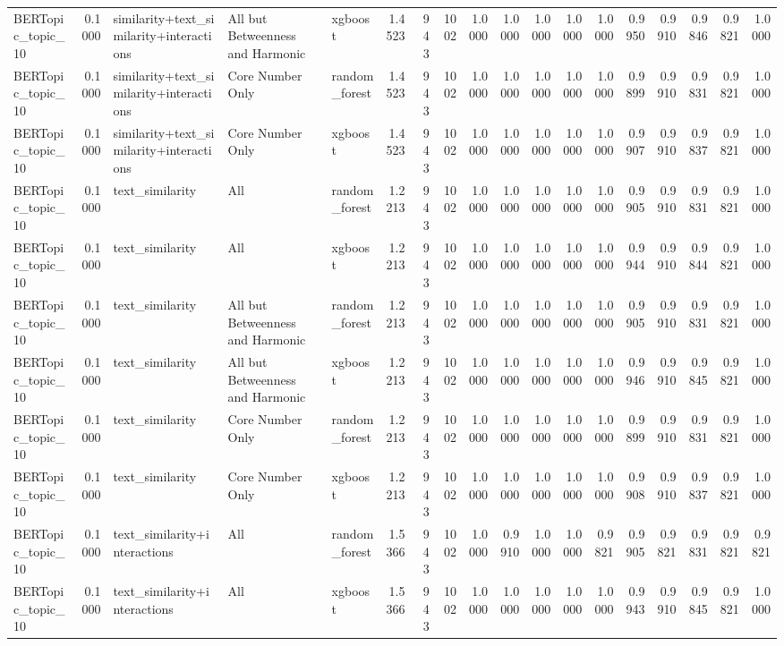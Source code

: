 \begin{tabular}{lrlllrrrrrrrrrrrrr}
BERTopic_topic_10 & 0.1000 & similarity+text_similarity+interactions & All but Betweenness and Harmonic & xgboost & 1.4523 & 943 & 1002 & 1.0000 & 1.0000 & 1.0000 & 1.0000 & 1.0000 & 0.9950 & 0.9910 & 0.9846 & 0.9821 & 1.0000 \\
BERTopic_topic_10 & 0.1000 & similarity+text_similarity+interactions & Core Number Only & random_forest & 1.4523 & 943 & 1002 & 1.0000 & 1.0000 & 1.0000 & 1.0000 & 1.0000 & 0.9899 & 0.9910 & 0.9831 & 0.9821 & 1.0000 \\
BERTopic_topic_10 & 0.1000 & similarity+text_similarity+interactions & Core Number Only & xgboost & 1.4523 & 943 & 1002 & 1.0000 & 1.0000 & 1.0000 & 1.0000 & 1.0000 & 0.9907 & 0.9910 & 0.9837 & 0.9821 & 1.0000 \\
BERTopic_topic_10 & 0.1000 & text_similarity & All & random_forest & 1.2213 & 943 & 1002 & 1.0000 & 1.0000 & 1.0000 & 1.0000 & 1.0000 & 0.9905 & 0.9910 & 0.9831 & 0.9821 & 1.0000 \\
BERTopic_topic_10 & 0.1000 & text_similarity & All & xgboost & 1.2213 & 943 & 1002 & 1.0000 & 1.0000 & 1.0000 & 1.0000 & 1.0000 & 0.9944 & 0.9910 & 0.9844 & 0.9821 & 1.0000 \\
BERTopic_topic_10 & 0.1000 & text_similarity & All but Betweenness and Harmonic & random_forest & 1.2213 & 943 & 1002 & 1.0000 & 1.0000 & 1.0000 & 1.0000 & 1.0000 & 0.9905 & 0.9910 & 0.9831 & 0.9821 & 1.0000 \\
BERTopic_topic_10 & 0.1000 & text_similarity & All but Betweenness and Harmonic & xgboost & 1.2213 & 943 & 1002 & 1.0000 & 1.0000 & 1.0000 & 1.0000 & 1.0000 & 0.9946 & 0.9910 & 0.9845 & 0.9821 & 1.0000 \\
BERTopic_topic_10 & 0.1000 & text_similarity & Core Number Only & random_forest & 1.2213 & 943 & 1002 & 1.0000 & 1.0000 & 1.0000 & 1.0000 & 1.0000 & 0.9899 & 0.9910 & 0.9831 & 0.9821 & 1.0000 \\
BERTopic_topic_10 & 0.1000 & text_similarity & Core Number Only & xgboost & 1.2213 & 943 & 1002 & 1.0000 & 1.0000 & 1.0000 & 1.0000 & 1.0000 & 0.9908 & 0.9910 & 0.9837 & 0.9821 & 1.0000 \\
BERTopic_topic_10 & 0.1000 & text_similarity+interactions & All & random_forest & 1.5366 & 943 & 1002 & 1.0000 & 0.9910 & 1.0000 & 1.0000 & 0.9821 & 0.9905 & 0.9821 & 0.9831 & 0.9821 & 0.9821 \\
BERTopic_topic_10 & 0.1000 & text_similarity+interactions & All & xgboost & 1.5366 & 943 & 1002 & 1.0000 & 1.0000 & 1.0000 & 1.0000 & 1.0000 & 0.9943 & 0.9910 & 0.9845 & 0.9821 & 1.0000 \\

\end{tabular}
